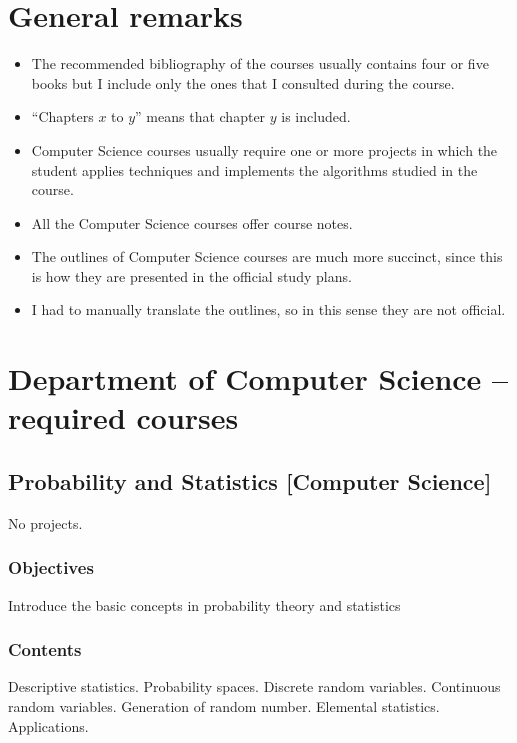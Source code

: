 \documentclass[spanish]{article}
\begin{document}
\section{General remarks}
\begin{itemize}
  \item
  The recommended bibliography of the courses usually contains four or five books
  but I include only the ones that I consulted during the course.

  \item
  ``Chapters $x$ to $y$'' means that chapter $y$ is included.

  \item
  Computer Science courses usually require one or more projects in which the student
  applies techniques and implements the algorithms studied in the course.

  \item
  All the Computer Science courses offer course notes.

  \item
  The outlines of Computer Science courses are much more succinct, since this is
  how they are presented in the official study plans.

  \item
  I had to manually translate the outlines, so in this sense they are not
  official.
\end{itemize}

\section{Department of Computer Science -- required courses}

\subsection{Probability and Statistics [Computer Science]}
No projects.

\subsubsection{Objectives}
Introduce the basic concepts in probability theory and statistics

\subsubsection{Contents}
Descriptive statistics. Probability spaces. Discrete random variables.
Continuous random variables. Generation of random number. Elemental statistics.
Applications.
\end{document}
